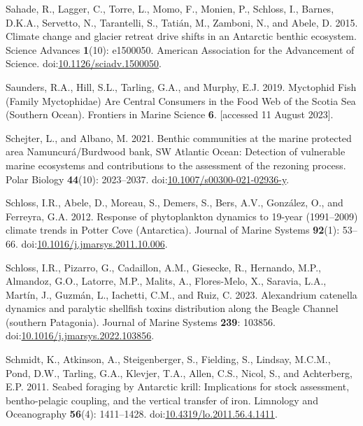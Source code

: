 \documentclass[
]{article}
\newlength{\cslhangindent}
\newenvironment{CSLReferences}[2] %
 {\begin{list}{}{%
  \setlength{\itemindent}{0pt}
  \setlength{\leftmargin}{0pt}
  \setlength{\parsep}{0pt}
  \ifodd #1
   \setlength{\leftmargin}{\cslhangindent}
   \setlength{\itemindent}{-1\cslhangindent}
  \fi
  \setlength{\itemsep}{#2\baselineskip}}}
 {\end{list}}
\begin{document}
\begin{CSLReferences}{1}{0}
Sahade, R., Lagger, C., Torre, L., Momo, F., Monien, P., Schloss, I.,
Barnes, D.K.A., Servetto, N., Tarantelli, S., Tatián, M., Zamboni, N.,
and Abele, D. 2015. Climate change and glacier retreat drive shifts in
an {Antarctic} benthic ecosystem. Science Advances \textbf{1}(10):
e1500050. American Association for the Advancement of Science.
doi:\href{https://doi.org/10.1126/sciadv.1500050}{10.1126/sciadv.1500050}.

Saunders, R.A., Hill, S.L., Tarling, G.A., and Murphy, E.J. 2019.
Myctophid {Fish} ({Family Myctophidae}) {Are Central Consumers} in the
{Food Web} of the {Scotia Sea} ({Southern Ocean}). Frontiers in Marine
Science \textbf{6}. {[}accessed 11 August 2023{]}.

Schejter, L., and Albano, M. 2021. Benthic communities at the marine
protected area {Namuncur{á}}/{Burdwood} bank, {SW Atlantic Ocean}:
Detection of vulnerable marine ecosystems and contributions to the
assessment of the rezoning process. Polar Biology \textbf{44}(10):
2023--2037.
doi:\href{https://doi.org/10.1007/s00300-021-02936-y}{10.1007/s00300-021-02936-y}.

Schloss, I.R., Abele, D., Moreau, S., Demers, S., Bers, A.V., González,
O., and Ferreyra, G.A. 2012. Response of phytoplankton dynamics to
19-year (1991--2009) climate trends in {Potter Cove} ({Antarctica}).
Journal of Marine Systems \textbf{92}(1): 53--66.
doi:\href{https://doi.org/10.1016/j.jmarsys.2011.10.006}{10.1016/j.jmarsys.2011.10.006}.

Schloss, I.R., Pizarro, G., Cadaillon, A.M., Giesecke, R., Hernando,
M.P., Almandoz, G.O., Latorre, M.P., Malits, A., Flores-Melo, X.,
Saravia, L.A., Martín, J., Guzmán, L., Iachetti, C.M., and Ruiz, C.
2023. Alexandrium catenella dynamics and paralytic shellfish toxins
distribution along the {Beagle Channel} (southern {Patagonia}). Journal
of Marine Systems \textbf{239}: 103856.
doi:\href{https://doi.org/10.1016/j.jmarsys.2022.103856}{10.1016/j.jmarsys.2022.103856}.

Schmidt, K., Atkinson, A., Steigenberger, S., Fielding, S., Lindsay,
M.C.M., Pond, D.W., Tarling, G.A., Klevjer, T.A., Allen, C.S., Nicol,
S., and Achterberg, E.P. 2011. Seabed foraging by {Antarctic} krill:
{Implications} for stock assessment, bentho-pelagic coupling, and the
vertical transfer of iron. Limnology and Oceanography \textbf{56}(4):
1411--1428.
doi:\href{https://doi.org/10.4319/lo.2011.56.4.1411}{10.4319/lo.2011.56.4.1411}.


\end{CSLReferences}
\end{document}
